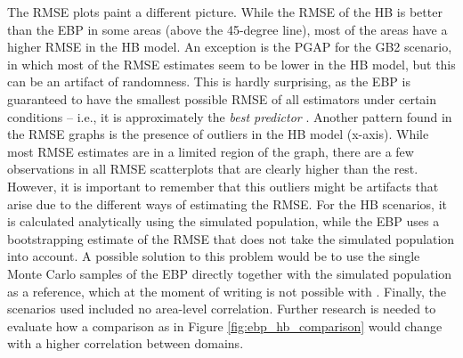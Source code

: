 The RMSE plots paint a different picture.
While the RMSE of the HB is better than the EBP in some areas (above the 45-degree line), most of the areas have a higher RMSE in the HB model.
An exception is the PGAP for the GB2 scenario, in which most of the RMSE estimates seem to be lower in the HB model, but this can be an artifact of randomness.
This is hardly surprising, as the EBP is guaranteed to have the smallest possible RMSE of all estimators under certain conditions – i.e., it is approximately the \textit{best predictor} \citep{molina_small_2014}.
Another pattern found in the RMSE graphs is the presence of outliers in the HB model (x-axis).
While most RMSE estimates are in a limited region of the graph, there are a few observations in all RMSE scatterplots that are clearly higher than the rest.
However, it is important to remember that this outliers might be artifacts that arise due to the different ways of estimating the RMSE.
For the HB scenarios, it is calculated analytically using the simulated population, while the EBP uses a bootstrapping estimate of the RMSE that does not take the simulated population into account.
A possible solution to this problem would be to use the single Monte Carlo samples of the EBP directly together with the simulated population as a reference, which at the moment of writing is not possible with .
Finally, the scenarios used included no area-level correlation.
Further research is needed to evaluate how a comparison as in Figure \ref{fig:ebp_hb_comparison} would change with a higher correlation between domains.

